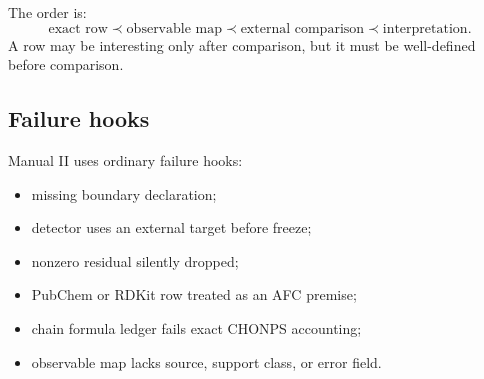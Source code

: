 The order is:
\[
\text{exact row} \prec \text{observable map} \prec \text{external comparison} \prec \text{interpretation}.
\]
A row may be interesting only after comparison, but it must be well-defined before comparison.

\subsection{Failure hooks}

Manual II uses ordinary failure hooks:
\begin{itemize}[leftmargin=2em]
  \item missing boundary declaration;
  \item detector uses an external target before freeze;
  \item nonzero residual silently dropped;
  \item PubChem or RDKit row treated as an AFC premise;
  \item chain formula ledger fails exact CHONPS accounting;
  \item observable map lacks source, support class, or error field.
\end{itemize}

